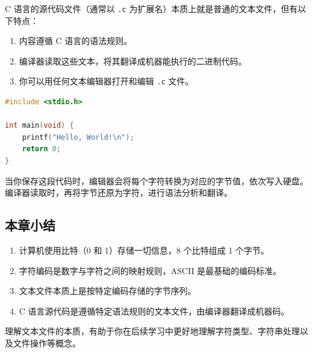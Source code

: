 C 语言的源代码文件（通常以 \texttt{.c} 为扩展名）本质上就是普通的文本文件，但有以下特点：

\begin{enumerate}[label={(\arabic*)}]
    \item 内容遵循 C 语言的语法规则。
    \item 编译器读取这些文本，将其翻译成机器能执行的二进制代码。
    \item 你可以用任何文本编辑器打开和编辑 \texttt{.c} 文件。
\end{enumerate}

\begin{lstlisting}[language=C, caption={一个简单的 C 源文件}, label={lst:simple_source}]
#include <stdio.h>

int main(void) {
    printf("Hello, World!\n");
    return 0;
}
\end{lstlisting}

当你保存这段代码时，编辑器会将每个字符转换为对应的字节值，依次写入硬盘。编译器读取时，再将字节还原为字符，进行语法分析和翻译。

\subsection{本章小结}
\label{subsec:text_file_summary}

\begin{enumerate}[label={(\arabic*)}]
    \item 计算机使用比特（0 和 1）存储一切信息，8 个比特组成 1 个字节。
    \item 字符编码是数字与字符之间的映射规则，ASCII 是最基础的编码标准。
    \item 文本文件本质上是按特定编码存储的字节序列。
    \item C 语言源代码是遵循特定语法规则的文本文件，由编译器翻译成机器码。
\end{enumerate}

理解文本文件的本质，有助于你在后续学习中更好地理解字符类型、字符串处理以及文件操作等概念。

